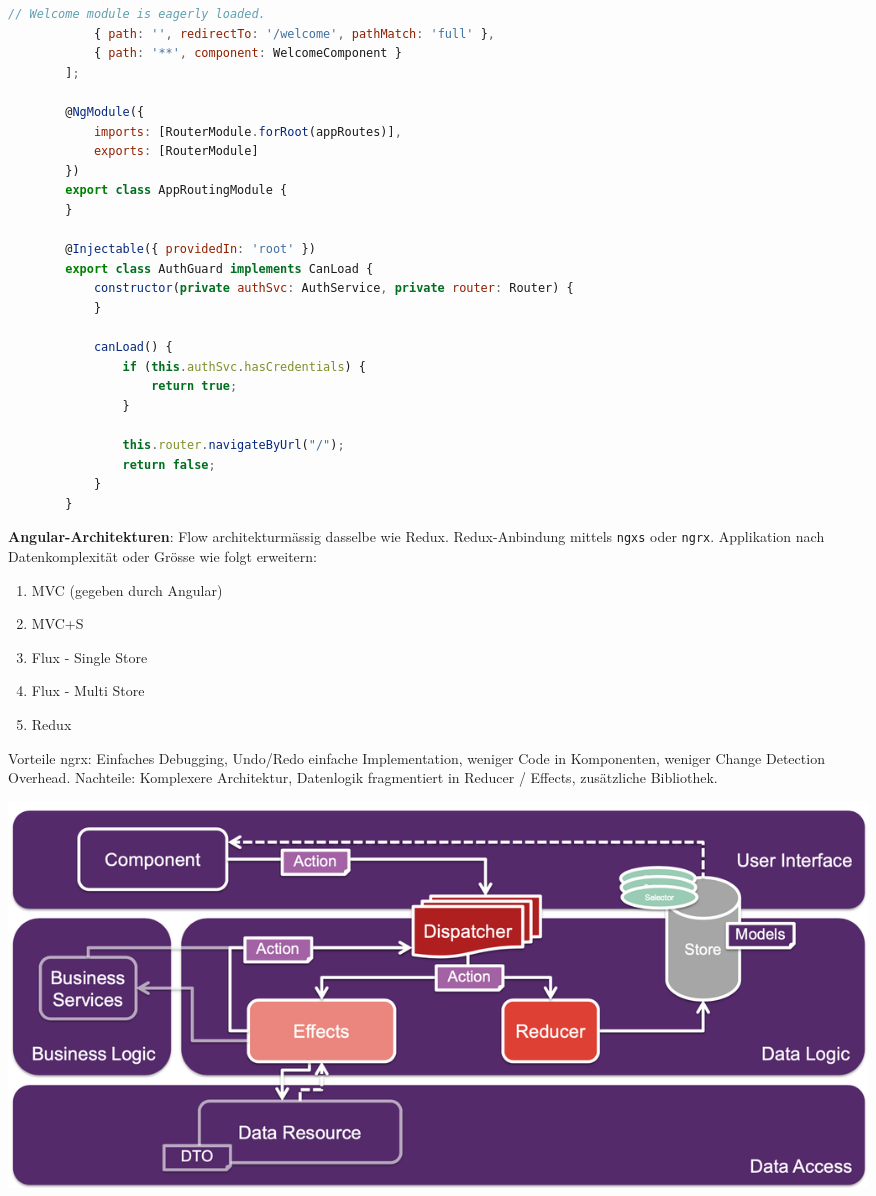 \documentclass[10pt,landscape]{article}
\begin{document}
\begin{multicols}{2}
\begin{lstlisting}[language=JavaScript]
            // Welcome module is eagerly loaded.
            { path: '', redirectTo: '/welcome', pathMatch: 'full' },
            { path: '**', component: WelcomeComponent }
        ];

        @NgModule({
            imports: [RouterModule.forRoot(appRoutes)],
            exports: [RouterModule]
        })
        export class AppRoutingModule {
        }

        @Injectable({ providedIn: 'root' })
        export class AuthGuard implements CanLoad {
            constructor(private authSvc: AuthService, private router: Router) {
            }

            canLoad() {
                if (this.authSvc.hasCredentials) {
                    return true;
                }

                this.router.navigateByUrl("/");
                return false;
            }
        }
        \end{lstlisting}

        \textbf{Angular-Architekturen}: Flow architekturmässig dasselbe wie Redux.
        Redux-Anbindung mittels \lstinline{ngxs} oder \lstinline{ngrx}.
        Applikation nach Datenkomplexität oder Grösse wie folgt erweitern:

        \begin{enumerate}
            \item MVC (gegeben durch Angular)
            \item MVC+S
            \item Flux - Single Store
            \item Flux - Multi Store
            \item Redux
        \end{enumerate}

        Vorteile ngrx: Einfaches Debugging, Undo/Redo einfache Implementation, weniger Code in Komponenten, weniger Change Detection Overhead.
        Nachteile: Komplexere Architektur, Datenlogik fragmentiert in Reducer / Effects, zusätzliche Bibliothek.

        \includegraphics[width=\linewidth]{angular_ngrx_architecture}


\end{multicols}
\end{document}
